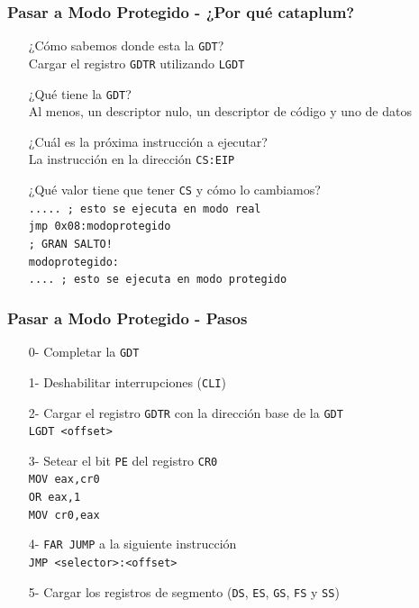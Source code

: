 \documentclass[aspectratio=169]{beamer}
\begin{document}
\begin{frame}[fragile]
    \frametitle{Pasar a Modo Protegido - ¿Por qué cataplum?}
    \begin{itemize}
    \setlength\itemsep{1.5em}
    \item[] \textcolor{verdeuca}{¿Cómo sabemos donde esta la \texttt{GDT}?}\\
    \pause
    Cargar el registro \verb|GDTR| utilizando \verb|LGDT|
    \item[] \textcolor{verdeuca}{¿Qué tiene la \texttt{GDT}?}\\
    \pause
    Al menos, un descriptor nulo, un descriptor de código y uno de datos
    \item[] \textcolor{verdeuca}{¿Cuál es la próxima instrucción a ejecutar?}\\
    \pause
    La instrucción en la dirección \verb|CS:EIP|
    \item[] \textcolor{verdeuca}{¿Qué valor tiene que tener \texttt{CS} y cómo lo cambiamos?}\\
    \pause
    \verb|..... ; esto se ejecuta en modo real|\\
    \verb|jmp 0x08:modoprotegido|\\
    \verb|; GRAN SALTO!|\\
    \verb|modoprotegido:|\\
    \verb|.... ; esto se ejecuta en modo protegido|
    \end{itemize}
\end{frame}

\begin{frame}[fragile]
    \frametitle{Pasar a Modo Protegido - Pasos}
    \begin{enumerate}
    \setlength\itemsep{1em}
     \item[0-] Completar la \verb|GDT|
     \item[1-] Deshabilitar interrupciones (\verb|CLI|)
     \item[2-] Cargar el registro \verb|GDTR| con la dirección base de la \verb|GDT|\\
                \hspace{1cm}\verb|LGDT <offset>|
     \item[3-] Setear el bit \verb|PE| del registro \verb|CR0|\\
                \hspace{1cm}\verb|MOV eax,cr0|\\
                \hspace{1cm}\verb|OR eax,1|\\
                \hspace{1cm}\verb|MOV cr0,eax|
     \item[4-] \verb|FAR JUMP| a la siguiente instrucción\\
                \hspace{1cm}\verb|JMP <selector>:<offset>|
     \item[5-] Cargar los registros de segmento (\verb|DS|, \verb|ES|, \verb|GS|, \verb|FS| y \verb|SS|)
    \end{enumerate}

\end{frame}
\end{document}
